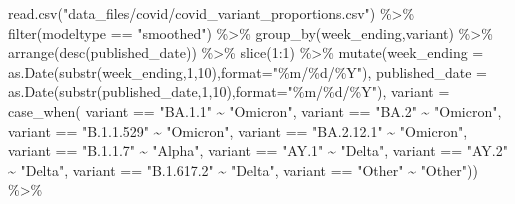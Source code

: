 \documentclass[
]{article}
\newenvironment{Shaded}{\begin{snugshade}}{\end{snugshade}}
\newcommand{\AttributeTok}[1]{\textcolor[rgb]{0.77,0.63,0.00}{#1}}
\newcommand{\DecValTok}[1]{\textcolor[rgb]{0.00,0.00,0.81}{#1}}
\newcommand{\FunctionTok}[1]{\textcolor[rgb]{0.00,0.00,0.00}{#1}}
\newcommand{\NormalTok}[1]{#1}
\newcommand{\SpecialCharTok}[1]{\textcolor[rgb]{0.00,0.00,0.00}{#1}}
\newcommand{\StringTok}[1]{\textcolor[rgb]{0.31,0.60,0.02}{#1}}
\begin{document}
\begin{Shaded}
\begin{Highlighting}[]
\FunctionTok{read.csv}\NormalTok{(}\StringTok{"data\_files/covid/covid\_variant\_proportions.csv"}\NormalTok{) }\SpecialCharTok{\%\textgreater{}\%}
  \FunctionTok{filter}\NormalTok{(modeltype }\SpecialCharTok{==} \StringTok{"smoothed"}\NormalTok{) }\SpecialCharTok{\%\textgreater{}\%}
  \FunctionTok{group\_by}\NormalTok{(week\_ending,variant) }\SpecialCharTok{\%\textgreater{}\%}
  \FunctionTok{arrange}\NormalTok{(}\FunctionTok{desc}\NormalTok{(published\_date)) }\SpecialCharTok{\%\textgreater{}\%}
  \FunctionTok{slice}\NormalTok{(}\DecValTok{1}\SpecialCharTok{:}\DecValTok{1}\NormalTok{) }\SpecialCharTok{\%\textgreater{}\%}
  \FunctionTok{mutate}\NormalTok{(}\AttributeTok{week\_ending =} \FunctionTok{as.Date}\NormalTok{(}\FunctionTok{substr}\NormalTok{(week\_ending,}\DecValTok{1}\NormalTok{,}\DecValTok{10}\NormalTok{),}\AttributeTok{format=}\StringTok{"\%m/\%d/\%Y"}\NormalTok{),}
         \AttributeTok{published\_date =} \FunctionTok{as.Date}\NormalTok{(}\FunctionTok{substr}\NormalTok{(published\_date,}\DecValTok{1}\NormalTok{,}\DecValTok{10}\NormalTok{),}\AttributeTok{format=}\StringTok{"\%m/\%d/\%Y"}\NormalTok{),}
         \AttributeTok{variant =} \FunctionTok{case\_when}\NormalTok{(}
\NormalTok{           variant }\SpecialCharTok{==} \StringTok{"BA.1.1"} \SpecialCharTok{\textasciitilde{}} \StringTok{"Omicron"}\NormalTok{,}
\NormalTok{           variant }\SpecialCharTok{==} \StringTok{"BA.2"} \SpecialCharTok{\textasciitilde{}} \StringTok{"Omicron"}\NormalTok{,}
\NormalTok{           variant }\SpecialCharTok{==} \StringTok{"B.1.1.529"} \SpecialCharTok{\textasciitilde{}} \StringTok{"Omicron"}\NormalTok{,}
\NormalTok{           variant }\SpecialCharTok{==} \StringTok{"BA.2.12.1"} \SpecialCharTok{\textasciitilde{}} \StringTok{"Omicron"}\NormalTok{,}
\NormalTok{           variant }\SpecialCharTok{==} \StringTok{"B.1.1.7"} \SpecialCharTok{\textasciitilde{}} \StringTok{"Alpha"}\NormalTok{,}
\NormalTok{           variant }\SpecialCharTok{==} \StringTok{"AY.1"} \SpecialCharTok{\textasciitilde{}} \StringTok{"Delta"}\NormalTok{,}
\NormalTok{           variant }\SpecialCharTok{==} \StringTok{"AY.2"} \SpecialCharTok{\textasciitilde{}} \StringTok{"Delta"}\NormalTok{,}
\NormalTok{           variant }\SpecialCharTok{==} \StringTok{"B.1.617.2"} \SpecialCharTok{\textasciitilde{}} \StringTok{"Delta"}\NormalTok{,}
\NormalTok{           variant }\SpecialCharTok{==} \StringTok{"Other"} \SpecialCharTok{\textasciitilde{}} \StringTok{"Other"}\NormalTok{)) }\SpecialCharTok{\%\textgreater{}\%}

\end{Highlighting}
\end{Shaded}
\end{document}
